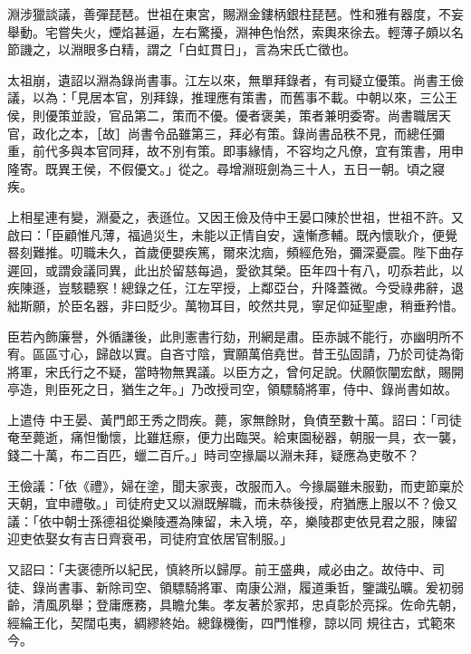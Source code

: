 \begin{pinyinscope}
 淵涉獵談議，善彈琵琶。世祖在東宮，賜淵金鏤柄銀柱琵琶。性和雅有器度，不妄舉動。宅嘗失火，煙焰甚逼，左右驚擾，淵神色怡然，索輿來徐去。輕薄子頗以名節譏之，以淵眼多白精，謂之「白虹貫日」，言為宋氏亡徵也。



 太祖崩，遺詔以淵為錄尚書事。江左以來，無單拜錄者，有司疑立優策。尚書王儉議，以為：「見居本官，別拜錄，推理應有策書，而舊事不載。中朝以來，三公王侯，則優策並設，官品第二，策而不優。優者褒美，策者兼明委寄。尚書職居天官，政化之本，［故］尚書令品雖第三，拜必有策。錄尚書品秩不見，而總任彌重，前代多與本官同拜，故不別有策。即事緣情，不容均之凡僚，宜有策書，用申隆寄。既異王侯，不假優文。」從之。尋增淵班劍為三十人，五日一朝。頃之寢
 疾。



 上相星連有變，淵憂之，表遜位。又因王儉及侍中王晏口陳於世祖，世祖不許。又啟曰：「臣顧惟凡薄，福過災生，未能以正情自安，遠慚彥輔。既內懷耿介，便覺晷刻難推。叨職未久，首歲便嬰疾篤，爾來沈痼，頻經危殆，彌深憂震。陛下曲存遲回，或謂僉議同異，此出於留慈每過，愛欲其榮。臣年四十有八，叨忝若此，以疾陳遜，豈駭聽察！總錄之任，江左罕授，上鄰亞台，升降蓋微。今受祿弗辭，退絀斯願，於臣名器，非曰貶少。萬物耳目，皎然共見，寧足仰延聖慮，稍垂矜惜。



 臣若內飾廉譽，外循謙後，此則憲書行劾，刑網是肅。臣赤誠不能行，亦幽明所不宥。區區寸心，歸啟以實。自吝寸陰，實願萬倍堯世。昔王弘固請，乃於司徒為衛將軍，宋氏行之不疑，當時物無異議。以臣方之，曾何足說。伏願恢闡宏猷，賜開亭造，則臣死之日，猶生之年。」乃改授司空，領驃騎將軍，侍中、錄尚書如故。



 上遣侍
 中王晏、黃門郎王秀之問疾。薨，家無餘財，負債至數十萬。詔曰：「司徒奄至薨逝，痛怛慟懷，比雖尪瘵，便力出臨哭。給東園秘器，朝服一具，衣一襲，錢二十萬，布二百匹，蠟二百斤。」時司空掾屬以淵未拜，疑應為吏敬不？



 王儉議：「依《禮》，婦在塗，聞夫家喪，改服而入。今掾屬雖未服勤，而吏節稟於天朝，宜申禮敬。」司徒府史又以淵既解職，而未恭後授，府猶應上服以不？儉又議：「依中朝士孫德祖從樂陵遷為陳留，未入境，卒，樂陵郡吏依見君之服，陳留迎吏依娶女有吉日齊衰弔，司徒府宜依居官制服。」



 又詔曰：「夫褒德所以紀民，慎終所以歸厚。前王盛典，咸必由之。故侍中、司徒、錄尚書事、新除司空、領驃騎將軍、南康公淵，履道秉哲，鑒識弘曠。爰初弱齡，清風夙舉；登庸應務，具瞻允集。孝友著於家邦，忠貞彰於亮採。佐命先朝，經綸王化，契闊屯夷，綢繆終始。總錄機衡，四門惟穆，諒以同
 規往古，式範來今。




\end{pinyinscope}
